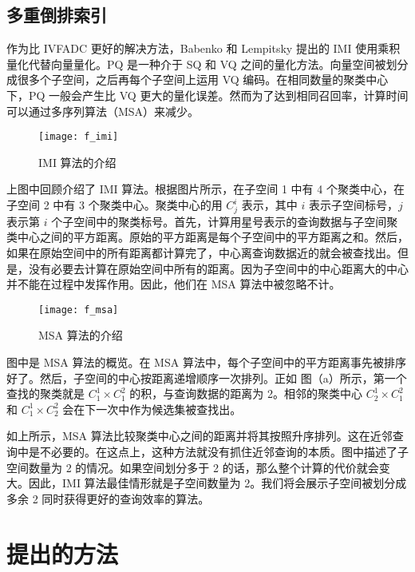 \subsection{多重倒排索引}
作为比 IVFADC 更好的解决方法，Babenko 和 Lempitsky 提出的 IMI 使用乘积量化代替向量量化。PQ 是一种介于 SQ 和 VQ 之间的量化方法。向量空间被划分成很多个子空间，之后再每个子空间上运用 VQ 编码。在相同数量的聚类中心下，PQ 一般会产生比 VQ 更大的量化误差。然而为了达到相同召回率，计算时间可以通过多序列算法（MSA）来减少。
\begin{figure}[H]
  \centering
  \texttt{[image: f\_imi]}
  \caption*{IMI 算法的介绍}
  \label{fig:f_imi}
\end{figure}
上图中回顾介绍了 IMI 算法。根据图片所示，在子空间 1 中有 4 个聚类中心，在子空间 2 中有 3 个聚类中心。聚类中心的用 $C_j^i$ 表示，其中 $i$ 表示子空间标号，$j$ 表示第 $i$ 个子空间中的聚类标号。首先，计算用星号表示的查询数据与子空间聚类中心之间的平方距离。原始的平方距离是每个子空间中的平方距离之和。然后，如果在原始空间中的所有距离都计算完了，中心离查询数据近的就会被查找出。但是，没有必要去计算在原始空间中所有的距离。因为子空间中的中心距离大的中心并不能在过程中发挥作用。因此，他们在 MSA 算法中被忽略不计。
\begin{figure}[H]
  \centering
  \texttt{[image: f\_msa]}
  \caption*{MSA 算法的介绍}
  \label{fig:f_msa}
\end{figure}
图中是 MSA 算法的概览。在 MSA 算法中，每个子空间中的平方距离事先被排序好了。然后，子空间的中心按距离递增顺序一次排列。正如 图（a）所示，第一个查找的聚类就是 $C_1^1 \times C_1^2$ 的积，与查询数据的距离为 2。相邻的聚类中心 $C_2^1 \times C_1^2$ 和 $C_1^1 \times C_2^2$ 会在下一次中作为候选集被查找出。

如上所示，MSA 算法比较聚类中心之间的距离并将其按照升序排列。这在近邻查询中是不必要的。在这点上，这种方法就没有抓住近邻查询的本质。图中描述了子空间数量为 2 的情况。如果空间划分多于 2 的话，那么整个计算的代价就会变大。因此，IMI 算法最佳情形就是子空间数量为 2。我们将会展示子空间被划分成多余 2 同时获得更好的查询效率的算法。
\section{提出的方法}
